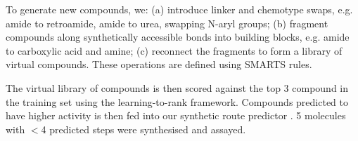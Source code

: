 


To generate new compounds, we: (a) introduce linker and chemotype swaps, e.g. amide to retroamide, amide to urea, swapping N-aryl groups; (b) fragment compounds along synthetically accessible bonds into building blocks, e.g. amide to carboxylic acid and amine; (c) reconnect the fragments to form a library of virtual compounds. These operations are defined using SMARTS rules. 

The virtual library of compounds is then scored against the top 3 compound in the training set using the learning-to-rank framework. Compounds predicted to have higher activity is then fed into our synthetic route predictor \cite{schwaller2019molecular,yang2019molecular}. 5 molecules with $<$4 predicted steps were synthesised and assayed. 

